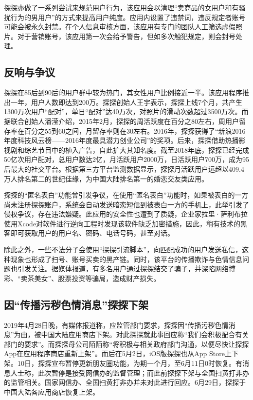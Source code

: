 \documentclass[UTF8]{ctexart}
\begin{document}
探探亦做了一系列尝试来规范用户行为，该应用会以清理“卖商品的女用户和有骚扰行为的男用户”的方式来提高用户纯度。应用内设置了违禁词，违反规定者账号可能会被永久封禁。在个人信息审核方面，该应用有专门的团队人工筛选虚假照片。对于营销账号，该应用第一次会给予警告，但如多次触犯规定，则会封号处理。

\subsection{反响与争议}
探探在85后到90后的用户群中较为热门，其女性用户比例接近一半。该应用程序推出一年，用户人数即达到200万。探探创始人王宇表示，探探上线7个月，共产生1300万次用户“配对”，单日“配对”达40万次，对照片的滑动次数超过3500万次。而据联合创始人潘滢介绍，2015年2月，探探的周活跃度在百分之80左右，周用户留存率在百分之55到60之间，月留存率则在30左右。2016年，探探获得了“新浪2016年度科技风云榜——2016年度最具潜力创业公司”的奖项。后来，探探借助热播影视剧和综艺节目中的植入广告，自此扩大其知名度。截至2018年底，探探已经完成50亿次用户配对，总用户数达2亿，月活跃用户2000万，日活跃用户700万，成为95后最大的社交平台。根据第三方平台监测数据显示，探探月活跃用户远超以409.4万人排名第二的世纪佳缘，为中国大陆排名第一的婚恋交友类应用。

探探的“匿名表白”功能曾引发争议，在使用“匿名表白”功能时，如果被表白的一方尚未注册探探账户，系统会自动发送暗恋短信到被表白一方的手机上，此举引发了侵权争议，存在违法嫌疑。此应用的安全性也遭到了质疑，企业家拉里·萨利布拉使用Xcode对软件进行逆向工程时发现该软件缺乏加密措施，因此，稍有技术的黑客即可获取用户的用户名、密码、电话号码，甚至对话。

除此之外，一些不法分子会使用“探探引流脚本”，向匹配成功的用户发送私信，这种现象也形成了扫号、账号买卖的黑产链。同时，该平台的传播欺诈与色情信息问题也引发关注。据媒体报道，有多名用户通过探探结交了骗子，并深陷网络博彩、“卖茶美女”、股票投资等骗局，造成财产损失。

\subsection{因“传播污秽色情消息”探探下架}

2019年4月28日晚，有媒体报道称，应监管部门要求，探探因“传播污秽色情消息”为由，被中国大陆应用商店下架。对此探探就此事回应称“我们会积极配合有关部门的要求”。而探探母公司陌陌称“将积极与相关政府部门沟通，以便尽快让探探App在应用程序商店重新上架”。而后在5月2日，iOS版探探也从App Store上下架。10日，探探宣布暂停更新朋友圈功能，为期一个月，至6月11日0时恢复。有消息人士称，此次暂停是接受网信办的监督管理；而此前探探下架与全国扫黄打非办的监管相关。国家网信办、全国扫黄打非办并未对此进行回应。6月29日，探探于中国大陆各应用商店恢复上架。
\end{document}
